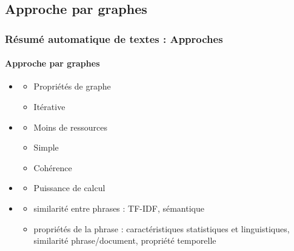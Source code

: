 \documentclass[xcolor=table]{beamer}
\begin{document}
\subsection{Approche par graphes} 

\begin{frame}
\frametitle{Résumé automatique de textes : Approches}
\framesubtitle{Approche par graphes}

\begin{itemize}
	\item {}
	\vspace{-.5cm}
	\begin{multicols}{2}
		\begin{itemize}
			\item Propriétés de graphe
			\item Itérative
		\end{itemize}
	\end{multicols}
	
	\item {}
	\vspace{-.5cm}
	\begin{multicols}{3}
		\begin{itemize}
			\item Moins de ressources
			\item Simple
			\item Cohérence
		\end{itemize}
	\end{multicols}
	
	\item {}
	\vspace{-.5cm}
	\begin{multicols}{2}
		\begin{itemize}
			\item Puissance de calcul
		\end{itemize}
	\end{multicols}
	
	\item {}
	\begin{itemize}
		\item similarité entre phrases : TF-IDF, sémantique
		\item propriétés de la phrase : caractéristiques statistiques et linguistiques, similarité phrase/document, propriété temporelle
	\end{itemize}
	
\end{itemize}
	
\end{frame}
\end{document}
